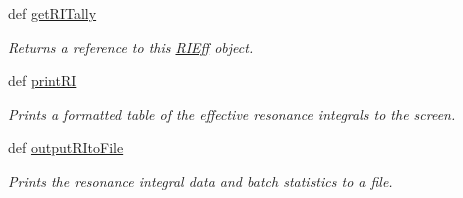 \begin{DoxyCompactItemize}
def \hyperlink{classpinspec_1_1process_1_1RIEff_a6b661611c10aa686c647f7e81ddb0525}{get\-R\-I\-Tally}
\begin{DoxyCompactList}\small\item\em Returns a reference to this \hyperlink{classpinspec_1_1process_1_1RIEff}{R\-I\-Eff} object. \end{DoxyCompactList}\item 
def \hyperlink{classpinspec_1_1process_1_1RIEff_ac3af925ad0212228c18d2dec7cd6a056}{print\-R\-I}
\begin{DoxyCompactList}\small\item\em Prints a formatted table of the effective resonance integrals to the screen. \end{DoxyCompactList}\item 
def \hyperlink{classpinspec_1_1process_1_1RIEff_a222c27b2e654c5823bbd0293d87a4292}{output\-R\-Ito\-File}
\begin{DoxyCompactList}\small\item\em Prints the resonance integral data and batch statistics to a file. \end{DoxyCompactList}\end{DoxyCompactItemize}
